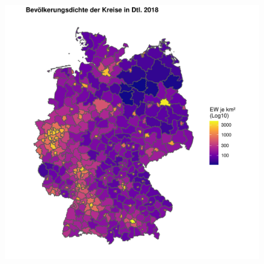 \begin{figure}[htb] %
    \centering %
    \begin{minipage}[b]{.45\linewidth} %
        \includegraphics[width=\linewidth,trim={2cm 1cm 1cm 1cm},clip]{body/figures/popdens2018.pdf} %
    \end{minipage} %
    \hfill
    \begin{minipage}[b]{.45\linewidth}

\end{minipage}
\end{figure}
